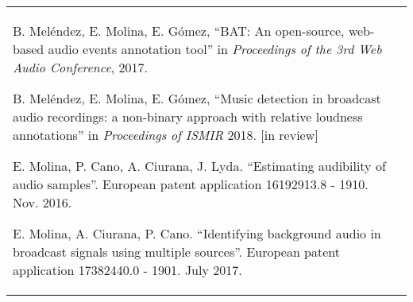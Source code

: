 \documentclass[letterpaper,11pt,oneside]{article}
\begin{document}
\begin{tabularx}{\linewidth}{l X}
\begin{itemize*}
  \item B. Meléndez, E. Molina, E. Gómez, ``BAT: An open-source, web-based audio events annotation tool'' in \textit{Proceedings of the 3rd Web Audio Conference}, 2017.
  
  \item B. Meléndez, E. Molina, E. Gómez, ``Music detection in broadcast audio recordings: a non-binary approach with relative loudness annotations'' in \textit{Proceedings of ISMIR} 2018. [in review]
 
 \item E. Molina, P. Cano, A. Ciurana, J. Lyda. ``Estimating audibility of audio samples''. European patent application 16192913.8 - 1910. Nov. 2016.
 
 \item E. Molina, A. Ciurana, P. Cano. ``Identifying background audio in broadcast signals using multiple sources''. European patent application 17382440.0 - 1901. July 2017.
 \end{itemize*}
\end{tabularx}
\end{document}
